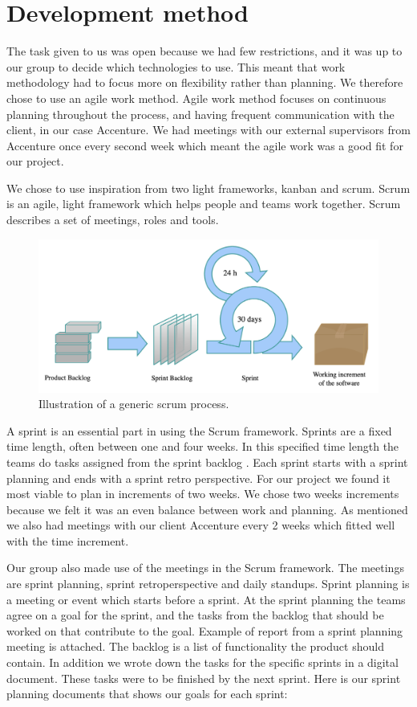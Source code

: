\section{Development method}
The task given to us was open because we had few restrictions, and it was up to our group to decide which technologies to use. This meant that work methodology had to focus more on flexibility rather than planning. We therefore chose to use an agile work method. Agile work method focuses on continuous planning throughout the process, and having frequent communication with the client, in our case Accenture. We had meetings with our external supervisors from Accenture once every second week which meant the agile work was a good fit for our project. 

We chose to use inspiration from two light frameworks, kanban and scrum. Scrum is an agile,  light framework which helps people and teams work together. Scrum describes a set of meetings, roles and tools.

\begin{figure}[h!]
	\centering
	\includegraphics[width=1\linewidth]{figures/scrum_process}
	\caption[scrum process]{Illustration of a generic scrum process.}
	\label{fig:scrumprocess}
\end{figure}


A sprint is an essential part in using the Scrum framework. Sprints are a fixed time length, often between one and four weeks. In this specified time length the teams do tasks assigned from the sprint backlog . Each sprint starts with a sprint planning and ends with a sprint retro perspective. For our project we found it most viable to plan in increments of two weeks. We chose two weeks increments because we felt it was an even balance between work and planning. As mentioned we also had meetings with our client Accenture every 2 weeks which fitted well with the time increment.  

Our group also made use of the meetings in the Scrum framework. The meetings are sprint planning, sprint retroperspective and daily standups. Sprint planning is a meeting or event which starts before a sprint. At the sprint planning the teams agree on a goal for the sprint, and the tasks from the backlog that should be worked on that contribute to the goal. Example of report from a sprint planning meeting is attached. The backlog is a list of functionality the product should contain. In addition we wrote down the tasks for the specific sprints in a digital document. These tasks were to be finished by the next sprint. Here is our sprint planning documents that shows our goals for each sprint:

